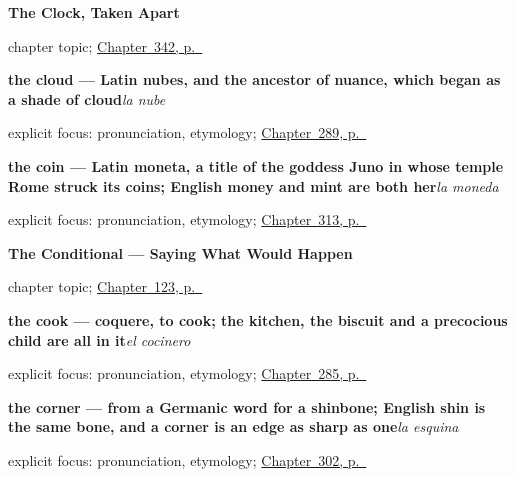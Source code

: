 \noindent\begin{minipage}[t]{\linewidth}
\raggedright
\textbf{The Clock, Taken Apart}\par
\footnotesize chapter topic; \hyperref[ch:el-minuto-y-el-cuarto]{Chapter~342, p.~\pageref*{ch:el-minuto-y-el-cuarto}}
\end{minipage}\par\smallskip

\noindent\begin{minipage}[t]{\linewidth}
\raggedright
\textbf{the cloud — Latin nubes, and the ancestor of nuance, which began as a shade of cloud}\enspace\emph{la nube}\par
\footnotesize explicit focus: pronunciation, etymology; \hyperref[ch:lo-de-arriba]{Chapter~289, p.~\pageref*{ch:lo-de-arriba}}
\end{minipage}\par\smallskip

\noindent\begin{minipage}[t]{\linewidth}
\raggedright
\textbf{the coin — Latin moneta, a title of the goddess Juno in whose temple Rome struck its coins; English money and mint are both her}\enspace\emph{la moneda}\par
\footnotesize explicit focus: pronunciation, etymology; \hyperref[ch:el-mostrador]{Chapter~313, p.~\pageref*{ch:el-mostrador}}
\end{minipage}\par\smallskip

\noindent\begin{minipage}[t]{\linewidth}
\raggedright
\textbf{The Conditional --- Saying What Would Happen}\par
\footnotesize chapter topic; \hyperref[ch:spanish-condicional]{Chapter~123, p.~\pageref*{ch:spanish-condicional}}
\end{minipage}\par\smallskip

\noindent\begin{minipage}[t]{\linewidth}
\raggedright
\textbf{the cook — coquere, to cook; the kitchen, the biscuit and a precocious child are all in it}\enspace\emph{el cocinero}\par
\footnotesize explicit focus: pronunciation, etymology; \hyperref[ch:quien-es]{Chapter~285, p.~\pageref*{ch:quien-es}}
\end{minipage}\par\smallskip

\noindent\begin{minipage}[t]{\linewidth}
\raggedright
\textbf{the corner — from a Germanic word for a shinbone; English shin is the same bone, and a corner is an edge as sharp as one}\enspace\emph{la esquina}\par
\footnotesize explicit focus: pronunciation, etymology; \hyperref[ch:calle-y-faro]{Chapter~302, p.~\pageref*{ch:calle-y-faro}}
\end{minipage}\par\smallskip


